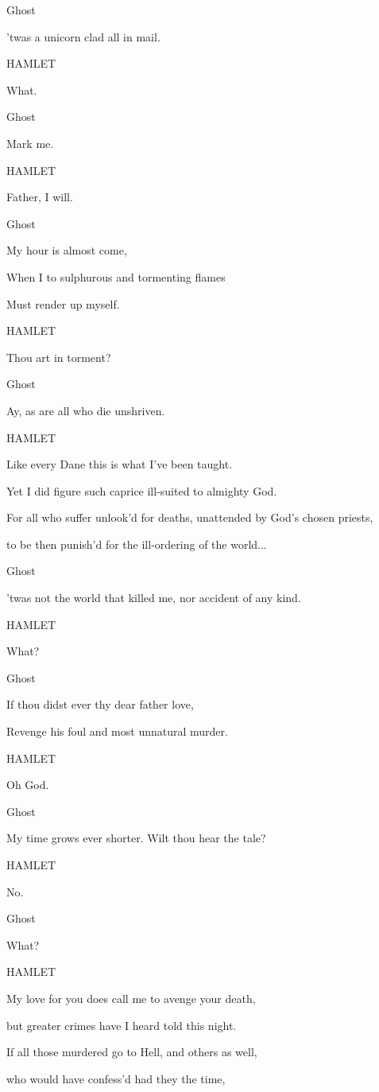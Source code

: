 Ghost

'twas a unicorn clad all in mail.

HAMLET

What.

Ghost

Mark me.

HAMLET

Father, I will.

Ghost

My hour is almost come,

When I to sulphurous and tormenting flames

Must render up myself.

HAMLET

Thou art in torment?

Ghost

Ay, as are all who die unshriven.

HAMLET

Like every Dane this is what I've been taught.

Yet I did figure such caprice ill-suited to almighty God.

For all who suffer unlook'd for deaths, unattended by God's chosen priests,

to be then punish'd for the ill-ordering of the world...

Ghost

'twas not the world that killed me, nor accident of any kind.

HAMLET

What?

Ghost

If thou didst ever thy dear father love,

Revenge his foul and most unnatural murder.

HAMLET

Oh God.

Ghost

My time grows ever shorter. Wilt thou hear the tale?

HAMLET

No.

Ghost

What?

HAMLET

My love for you does call me to avenge your death,

but greater crimes have I heard told this night.

If all those murdered go to Hell, and others as well,

who would have confess'd had they the time,

